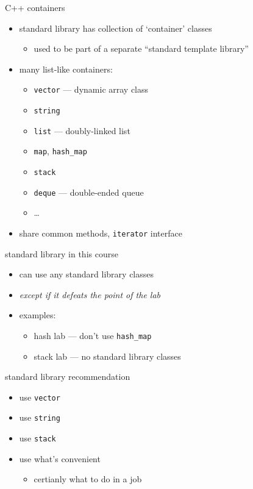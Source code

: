\begin{frame}{C++ containers}
    \begin{itemize}
    \item standard library has collection of `container' classes
        \begin{itemize}
        \item used to be part of a separate ``standard template library''
        \end{itemize}
    \item many list-like containers:
        \begin{itemize}
        \item \texttt{vector} --- dynamic array class
        \item \texttt{string}
        \item \texttt{list} --- doubly-linked list
        \item \texttt{map}, \texttt{hash\_map}
        \item \texttt{stack}
        \item \texttt{deque} --- double-ended queue
        \item \ldots
        \end{itemize}
    \item share common methods, \texttt{iterator} interface
    \end{itemize}
\end{frame}

\begin{frame}{standard library in this course}
    \begin{itemize}
    \item can use any standard library classes
    \item \textit{except if it defeats the point of the lab}
    \item examples:
        \begin{itemize}
        \item hash lab --- don't use \texttt{hash\_map}
        \item stack lab --- no standard library classes
        \end{itemize}
    \end{itemize}
\end{frame}

\begin{frame}{standard library recommendation}
    \begin{itemize}
        \item use \texttt{vector}
        \item use \texttt{string}
        \item use \texttt{stack}
        \item use what's convenient
            \begin{itemize}
            \item certianly what to do in a job
            \end{itemize}
    \end{itemize}
\end{frame}

